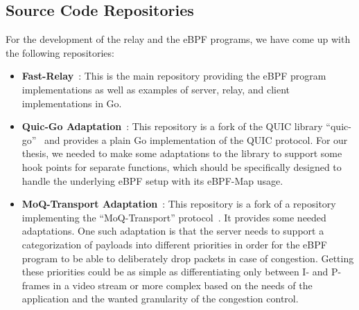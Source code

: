 \subsection{Source Code Repositories}\label{sec:source_code_repos}
For the development of the relay and the eBPF programs, we have come up with the following repositories:
\begin{itemize}

    \item \textbf{Fast-Relay}~\parencite{adaptive-moq-repo}:
    This is the main repository providing the eBPF program implementations as well as examples of 
    server, relay, and client implementations in Go.
    
    \item \textbf{Quic-Go Adaptation}~\parencite{quic-go-prio-packs-repo}:
    This repository is a fork of the QUIC library ``quic-go''~\parencite{quic-go-repo} and provides a 
    plain Go implementation of the QUIC protocol.
    For our thesis, we needed to make some adaptations to the library to support some hook points for 
    separate functions, which should be specifically designed to handle the underlying eBPF setup with its eBPF-Map usage. 
    
    \item \textbf{MoQ-Transport Adaptation}~\parencite{priority-moqtransport-repo}:
    This repository is a fork of a repository implementing the ``MoQ-Transport'' 
    protocol~\parencite{draft-moqtransport}.
    It provides some needed adaptations. 
    One such adaptation is that the server needs to support a 
    categorization of payloads into different priorities in order for the eBPF program to be able to 
    deliberately drop packets in case of congestion.
    Getting these priorities could be as simple as differentiating only between I- and P-frames in a video 
    stream or more complex based on the needs of the application and the wanted granularity of the congestion 
    control.
    
\end{itemize}